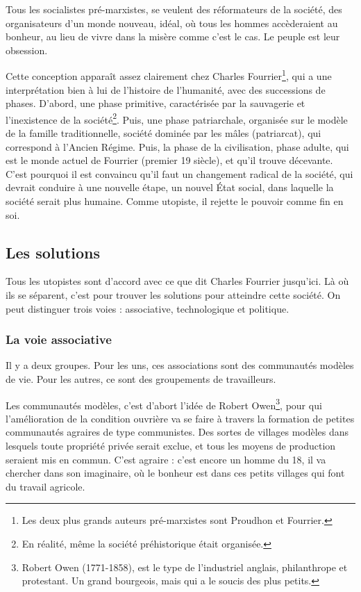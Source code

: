 \documentclass[12pt]{report}
\begin{document}
Tous les socialistes pré-marxistes, se veulent des réformateurs de la société, des organisateurs d'un monde nouveau, idéal, où tous les hommes accèderaient au bonheur, au lieu de vivre dans la misère comme c'est le cas. Le peuple est leur obsession.

Cette conception apparaît assez clairement chez Charles Fourrier\footnote{Les deux plus grands auteurs pré-marxistes sont Proudhon et Fourrier.}, qui a une interprétation bien à lui de l'histoire de l'humanité, avec des successions de phases. D'abord, une phase primitive, caractérisée par la sauvagerie et l'inexistence de la société\footnote{En réalité, même la société préhistorique était organisée.}. Puis, une phase patriarchale, organisée sur le modèle de la famille traditionnelle, société dominée par les mâles (patriarcat), qui correspond à l'Ancien Régime. Puis, la phase de la civilisation, phase adulte, qui est le monde actuel de Fourrier (premier 19 siècle), et qu'il trouve décevante. C'est pourquoi il est convaincu qu'il faut un changement radical de la société, qui devrait conduire à une nouvelle étape, un nouvel État social, dans laquelle la société serait plus humaine.
Comme utopiste, il rejette le pouvoir comme fin en soi.

\subsection{Les solutions}

Tous les utopistes sont d'accord avec ce que dit Charles Fourrier jusqu'ici. Là où ils se séparent, c'est pour trouver les solutions pour atteindre cette société. On peut distinguer trois voies : associative, technologique et politique.

\subsubsection{La voie associative}

Il y a deux groupes.
Pour les uns, ces associations sont des communautés modèles de vie. Pour les autres, ce sont des groupements de travailleurs.

Les communautés modèles, c'est d'abort l'idée de Robert Owen\footnote{Robert Owen (1771-1858), est le type de l'industriel anglais, philanthrope et protestant. Un grand bourgeois, mais qui a le soucis des plus petits.}, pour qui l'amélioration de la condition ouvrière va se faire à travers la formation de petites communautés agraires de type communistes. Des sortes de villages modèles dans lesquels toute propriété privée serait exclue, et tous les moyens de production seraient mis en commun.
C'est agraire : c'est encore un homme du 18, il va chercher dans son imaginaire, où le bonheur est dans ces petits villages qui font du travail agricole.
\end{document}
